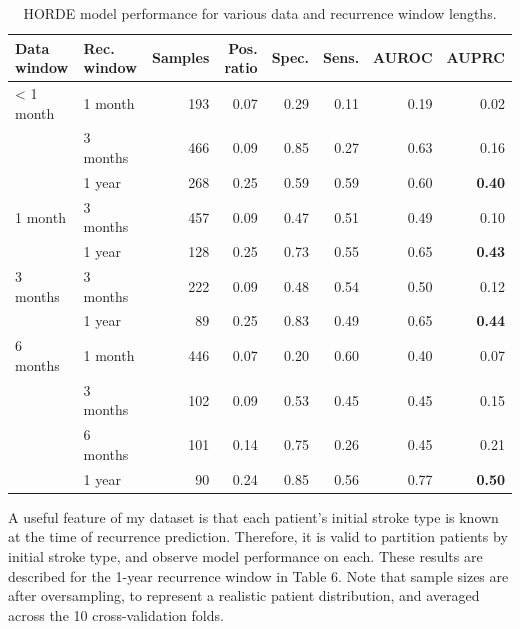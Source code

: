 \documentclass{article}
\begin{document}
\begin{table}
    \caption{
      HORDE model performance for various data and recurrence window lengths.
    }
    \label{tab:exp}
    \centering
    \centering
    \label{tab:exp-synth}
    \begin{small}
    \begin{sc}
    \begin{tabular}{llrrrrrr}
    \toprule
    Data window & Rec. window & Samples & Pos. ratio & Spec. & Sens. & AUROC & AUPRC \\
    \midrule
    < 1 month & 1 month & 193 & 0.07 & 0.29 & 0.11 & 0.19 & 0.02  \\
              & 3 months & 466 & 0.09 & 0.85 & 0.27 & 0.63 & 0.16 \\
              & 1 year & 268 & 0.25 & 0.59 & 0.59 & 0.60 & \textbf{0.40} \\
    \midrule
    1 month  & 3 months & 457 & 0.09 & 0.47 & 0.51 & 0.49 & 0.10 \\
             & 1 year & 128 & 0.25 & 0.73 & 0.55 & 0.65 & \textbf{0.43} \\
    \midrule
    3 months & 3 months & 222 & 0.09 & 0.48 & 0.54 & 0.50 & 0.12 \\
             & 1 year & 89 & 0.25 & 0.83 & 0.49 & 0.65 & \textbf{0.44}\\
    \midrule
    6 months & 1 month & 446 & 0.07 & 0.20 & 0.60 & 0.40 & 0.07 \\ %
             & 3 months & 102 & 0.09 & 0.53 & 0.45 & 0.45& 0.15 \\
             & 6 months & 101 & 0.14 & 0.75 & 0.26 & 0.45 & 0.21 \\
             & 1 year & 90 & 0.24 & 0.85 & 0.56 & 0.77 & \textbf{0.50} \\
             
    \bottomrule
    \end{tabular}
    \end{sc}
    \end{small}

\end{table}

A useful feature of my dataset is that each patient's initial stroke type is known at the time of recurrence prediction. Therefore, it is valid to partition patients by initial stroke type, and observe model performance on each. These results are described for the 1-year recurrence window in Table 6. Note that sample sizes are after oversampling, to represent a realistic patient distribution, and averaged across the 10 cross-validation folds.
\end{document}
